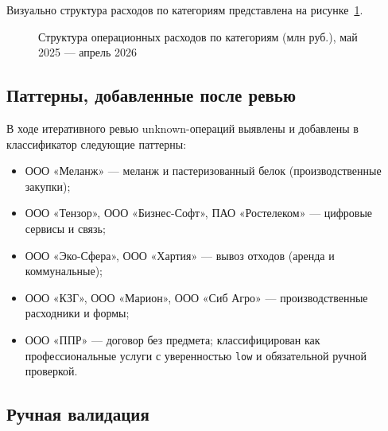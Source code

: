 Визуально структура расходов по категориям представлена на рисунке~\ref{fig:expenses_bar}.

\begin{figure}[H]
\centering
{}
\caption{Структура операционных расходов по категориям (млн руб.), май 2025 --- апрель 2026}
\label{fig:expenses_bar}
\end{figure}

\subsection{Паттерны, добавленные после ревью}

В ходе итеративного ревью unknown-операций выявлены и добавлены в классификатор следующие паттерны:
\begin{itemize}
  \item ООО «Меланж» --- меланж и пастеризованный белок (производственные закупки);
  \item ООО «Тензор», ООО «Бизнес-Софт», ПАО «Ростелеком» --- цифровые сервисы и связь;
  \item ООО «Эко-Сфера», ООО «Хартия» --- вывоз отходов (аренда и коммунальные);
  \item ООО «КЗГ», ООО «Марион», ООО «Сиб Агро» --- производственные расходники и формы;
  \item ООО «ППР» --- договор без предмета; классифицирован как профессиональные услуги с уверенностью \texttt{low} и обязательной ручной проверкой.
\end{itemize}

\subsection{Ручная валидация}

